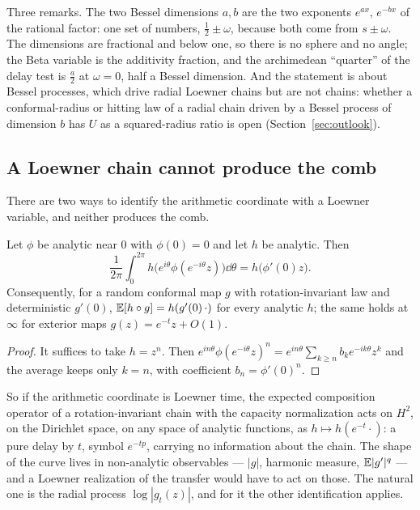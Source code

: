 Three remarks. The two Bessel dimensions $a,b$ are the two exponents $e^{ax}$,
$e^{-bx}$ of the rational factor: one set of numbers, $\frac12\pm\omega$,
because both come from $s\pm\omega$. The dimensions are fractional and below
one, so there is no sphere and no angle; the Beta variable is the additivity
fraction, and the archimedean ``quarter'' of the delay test
\cite[Section~11]{WilsonLines} is $\frac a2$ at $\omega=0$, half a Bessel
dimension. And the statement is about Bessel processes, which drive radial
Loewner chains but are not chains: whether a conformal-radius or hitting law
of a radial chain driven by a Bessel process of dimension $b$ has $U$ as a
squared-radius ratio is open (Section~\ref{sec:outlook}).

\subsection{A Loewner chain cannot produce the comb}\label{sec:nocomb}

There are two ways to identify the arithmetic coordinate with a Loewner
variable, and neither produces the comb.

\begin{lemma}\label{lem:rotation}
Let $\phi$ be analytic near $0$ with $\phi(0)=0$ and let $h$ be analytic. Then
\begin{equation}\label{eq:rotation}
 \frac1{2\pi}\int_0^{2\pi}h\big(e^{i\theta}\phi(e^{-i\theta}z)\big)\dd\theta=h\big(\phi'(0)z\big).
\end{equation}
Consequently, for a random conformal map $g$ with rotation-invariant law and
deterministic $g'(0)$, $\mathbb E[h\circ g]=h(g'(0)\,\cdot)$ for every analytic $h$;
the same holds at $\infty$ for exterior maps $g(z)=e^{-t}z+O(1)$.
\end{lemma}
\begin{proof}
It suffices to take $h=z^n$. Then $e^{in\theta}\phi(e^{-i\theta}z)^n=e^{in\theta}\sum_{k\geq n}b_ke^{-ik\theta}z^k$
and the average keeps only $k=n$, with coefficient $b_n=\phi'(0)^n$.
\end{proof}

So if the arithmetic coordinate is Loewner time, the expected composition
operator of a rotation-invariant chain with the capacity normalization acts on
$H^2$, on the Dirichlet space, on any space of analytic functions, as
$h\mapsto h(e^{-t}\cdot)$: a pure delay by $t$, symbol $e^{-tp}$, carrying no
information about the chain. The shape of the curve lives in non-analytic
observables --- $|g|$, harmonic measure, $\mathbb E|g'|^q$ --- and a Loewner
realization of the transfer would have to act on those. The natural one is the
radial process $\log|g_t(z)|$, and for it the other identification applies.

